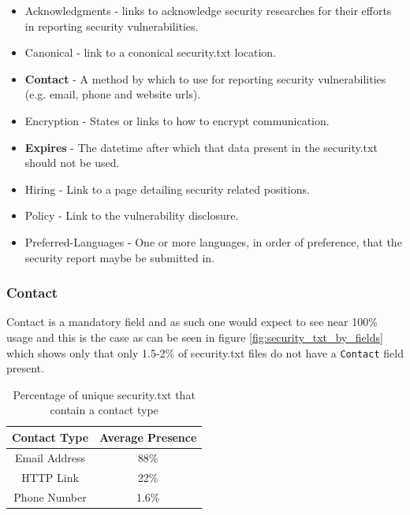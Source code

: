 \documentclass{mscreport}
\begin{document}
\begin{itemize}
	\setlength\itemsep{0.1em}
    \item Acknowledgments - links to acknowledge security researches for their efforts in reporting security vulnerabilities.
    \item Canonical - link to a cononical security.txt location.
    \item \textbf{Contact} - A method by which to use for reporting security vulnerabilities (e.g. email, phone and website urls).
    \item Encryption - States or links to how to encrypt communication.
    \item \textbf{Expires} - The datetime after which that data present in the security.txt should not be used.
    \item Hiring - Link to a page detailing security related positions.
    \item Policy - Link to the vulnerability disclosure.
    \item Preferred-Languages - One or more languages, in order of preference, that the security report maybe be submitted in.
\end{itemize}

\subsubsection{Contact}

\noindent
Contact is a mandatory field and as such one would expect to see near 100\% usage and this is the case as can be seen in figure \ref{fig:security_txt_by_fields} which shows only that only 1.5-2\% of security.txt files do not have a \texttt{Contact} field present.

\begin{table}[H]
  \begin{center}
    \begin{tabular}{|c|c|}  %
      \hline
      \textbf{Contact Type} & \textbf{Average Presence}\\
      \hline
      Email Address & 88\%\\
      \hline
      HTTP Link & 22\%\\
      \hline
      Phone Number & 1.6\%\\
      \hline
    \end{tabular}
    \caption{Percentage of unique security.txt that contain a contact type}
    \label{table:security_txt_by_contact_type} %
  \end{center}
\end{table}
\end{document}
